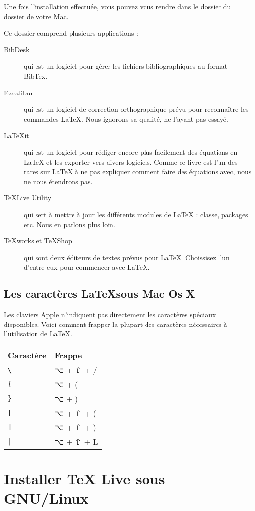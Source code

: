 Une fois l'installation effectuée, vous pouvez vous rendre dans le dossier  du dossier  de votre Mac.

Ce dossier comprend plusieurs applications :
\begin{description}
\item[BibDesk] qui est un logiciel pour gérer les fichiers bibliographiques au format BibTex.
\item[Excalibur] qui est un logiciel de correction orthographique prévu pour reconnaître les commandes \LaTeX{}. Nous ignorons sa qualité, ne l'ayant pas essayé.
\item[LaTeXit] qui est un logiciel pour rédiger encore plus facilement des équations en \LaTeX{} et les exporter vers divers logiciels. Comme ce livre est l'un des rares sur \LaTeX{} à ne pas expliquer comment faire des équations avec, nous ne nous étendrons pas.
\item[TeXLive Utility] qui sert à mettre à jour les différents modules de \LaTeX{} : classe, packages etc. Nous en parlons plus loin. 
\item[TeXworks et TeXShop] qui sont deux éditeurs de textes prévus pour \LaTeX. Choissisez l'un d'entre eux pour commencer avec \LaTeX{}.
\end{description}

\subsection{Les caractères \LaTeX sous Mac Os X}\label{claviermac}

Les claviers Apple n'indiquent pas directement les caractères spéciaux disponibles. Voici comment frapper la plupart des caractères nécessaires à l'utilisation de \LaTeX.

\begin{longtable}{|ll|}
\hline
Caractère & Frappe \\
\hline
\endhead
\hline
\endfoot
\verb+\+ & ⌥ + ⇧ + / \\
\verb+{+ & ⌥ + (\\
\verb+}+ & ⌥ + )\\
\verb+[+ & ⌥ + ⇧ + ( \\
\verb+]+ & ⌥ + ⇧ + ) \\
\verb+|+ & ⌥ + ⇧ + L  \\
\end{longtable}
\section{Installer TeX Live sous GNU/Linux}

